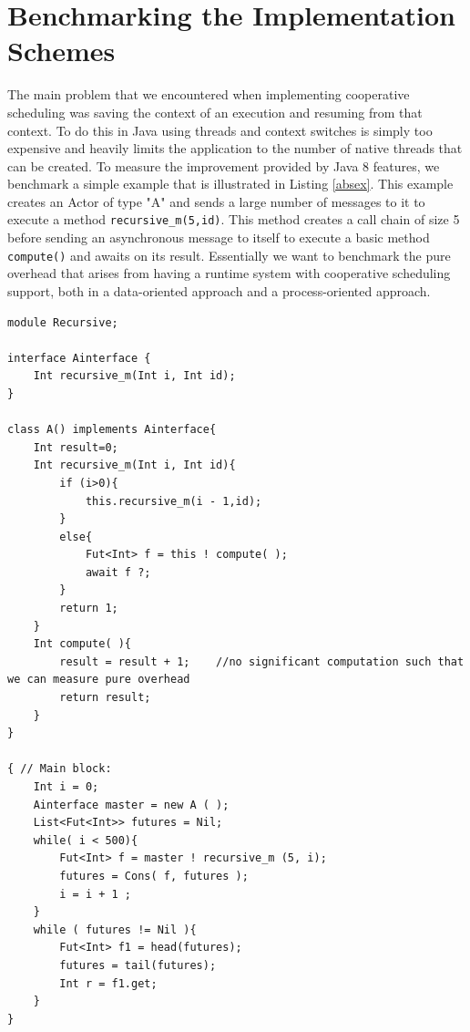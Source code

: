 \section{Benchmarking the Implementation Schemes}
\label{bench}
The main problem that we encountered  when implementing cooperative scheduling was saving the context of an execution and resuming from that context. To do this in Java using threads and context switches is simply too expensive and heavily limits the application to the number of native threads that can be created. To measure the improvement provided by Java 8 features, we benchmark a simple example that is illustrated in Listing \ref{absex}. This example creates an Actor of type "A" and sends a large number of messages to it to execute a method \lstinline|recursive_m(5,id)|. This method creates a call chain of size 5 before sending an asynchronous message to itself to execute a basic method \lstinline|compute()| and awaits on its result. Essentially we want to benchmark the pure overhead that arises from having a runtime system with cooperative scheduling support, both in a data-oriented approach and a process-oriented approach.




\begin{lstlisting}[caption= ABS Example, label=absex]
module Recursive;

interface Ainterface {
	Int recursive_m(Int i, Int id);
}

class A() implements Ainterface{
	Int result=0;
	Int recursive_m(Int i, Int id){
		if (i>0){
			this.recursive_m(i - 1,id);	
		}
		else{
			Fut<Int> f = this ! compute( );
			await f ?;
		}
		return 1;
	}
	Int compute( ){
		result = result + 1;	//no significant computation such that we can measure pure overhead
		return result;
	}
}

{ // Main block:
	Int i = 0;	
	Ainterface master = new A ( );
	List<Fut<Int>> futures = Nil;	
	while( i < 500){		
		Fut<Int> f = master ! recursive_m (5, i);
		futures = Cons( f, futures );
		i = i + 1 ;
	}
	while ( futures != Nil ){
		Fut<Int> f1 = head(futures);
		futures = tail(futures);
		Int r = f1.get;
	}
}
\end{lstlisting}

